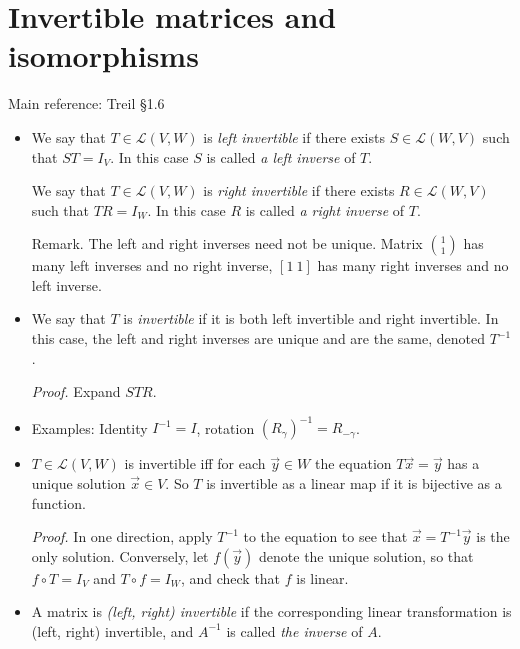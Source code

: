 \documentclass[11pt]{article}
\newcommand{\1}{\mathbf{1}}
\newcommand{\0}{\mathbf{0}}
\newcommand{\cL}{\mathcal{L}}
\newcommand{\vx}{\vec{x}}
\newcommand{\vy}{\vec{y}}
\begin{document}
\clearpage
\section{Invertible matrices and isomorphisms}
\label{sec:invertible}

Main reference:
Treil \S1.6

\begin{itemize}

\item

We say that $T \in \cL(V,W)$ is \emph{left invertible} if there exists $S \in \cL(W,V)$ such that $ST=I_V$.
In this case $S$ is called \emph{a left inverse} of $T$.

We say that $T \in \cL(V,W)$ is \emph{right invertible} if there exists $R \in \cL(W,V)$ such that $TR=I_W$.
In this case $R$ is called \emph{a right inverse} of $T$.

Remark.
The left and right inverses need not be unique.
Matrix $\binom{1}{1}$ has many left inverses and no right inverse,
$[1 \ 1]$
has many right inverses and no left inverse.

\item

We say that $T$ is \emph{invertible} if it is both left invertible and right invertible.
In this case, the left and right inverses are unique and are the same, denoted $T^{-1}$.

\emph{Proof.}
Expand $STR$.

\item

Examples:
Identity $I^{-1}=I$, rotation $(R_\gamma)^{-1}=R_{-\gamma}$.

\item

$T \in \cL(V,W)$ is invertible iff for each $\vy\in W$ the equation $T\vx = \vy$ has a unique solution $\vx \in V$.
So $T$ is invertible as a linear map if it is bijective as a function.

\emph{Proof.}
In one direction, apply $T^{-1}$ to the equation to see that $\vx = T^{-1} \vy$ is the only solution.
Conversely, let $f(\vy)$ denote the unique solution, so that $f \circ T = I_V$ and $T \circ f = I_W$, and check that $f$ is linear.

\item

A matrix is \emph{(left, right) invertible} if the corresponding linear transformation is (left, right) invertible, and $A^{-1}$ is called \emph{the inverse} of $A$.


\end{itemize}
\end{document}
